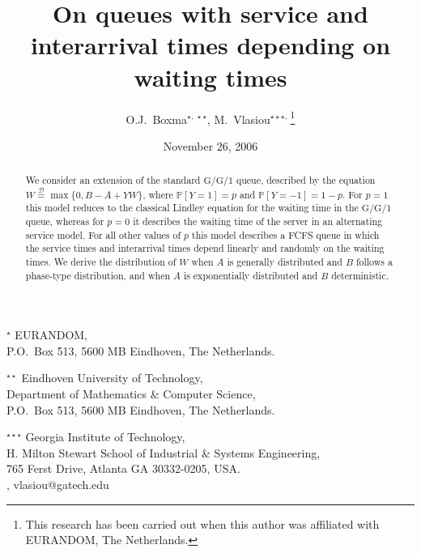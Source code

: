 \documentclass[reqno, 11pt, a4paper]{article}
\theoremstyle{plain}
\theoremstyle{remark}
\numberwithin{equation}{section}
\begin{document}
\title{On queues with service and interarrival times depending on waiting times}
\author{O.J.\ Boxma$^{\star,\,\star\star}$, M.\ Vlasiou$^{\star\star\star,\,}$\footnote{This research has been carried out when this author was affiliated with EURANDOM, The Netherlands.}}
\date{November 26, 2006}
\maketitle
\begin{center}
$^\star$ EURANDOM,\\
P.O.\ Box 513, 5600 MB Eindhoven, The Netherlands.
\end{center}

\begin{center}
$^{\star\star}$ Eindhoven University of Technology,
\\Department of Mathematics \& Computer Science,
\\P.O.\ Box 513, 5600 MB Eindhoven, The Netherlands.
\end{center}

\begin{center}
$^{\star\star\star}$ Georgia Institute of Technology,
\\H. Milton Stewart School of Industrial \& Systems Engineering,
\\765 Ferst Drive, Atlanta GA 30332-0205, USA.
\\, {{vlasiou@gatech.edu}}
\end{center}

\begin{abstract}
We consider an extension of the standard $\mathrm{G/G/1}$ queue, described by the equation $W\stackrel{{\mathcal{{D}}}}{=}\max\{0, B-A+YW\}$, where ${\mathbb{P}}[Y=1]=p$ and ${\mathbb{P}}[Y=-1]=1-p$. For $p=1$ this model reduces to the classical Lindley equation for the waiting time in the $\mathrm{G/G/1}$ queue, whereas for $p=0$ it describes the waiting time of the server in an alternating service model. For all other values of $p$ this model describes a FCFS queue in which the service times and interarrival times depend linearly and randomly on the waiting times. We derive the distribution of $W$ when $A$ is generally distributed and $B$ follows a phase-type distribution, and when $A$ is exponentially distributed and $B$ deterministic.
\end{abstract}
\end{document}
